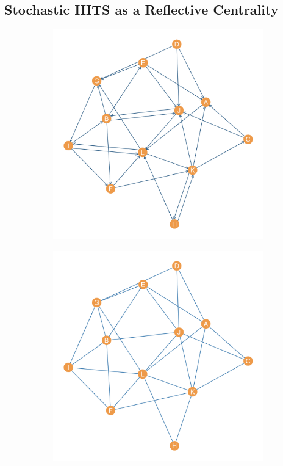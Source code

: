 \documentclass[a4paper,fleqn]{cas-sc}
\begin{document}
\subsection{Stochastic HITS as a Reflective Centrality}

\begin{figure}[t!]
    \captionsetup[subfigure]{font=footnotesize,labelfont=footnotesize}
     \centering
     \begin{subfigure}[b]{0.45\textwidth}
        \includegraphics[width=1.0\textwidth]{Plots/directed.png}
        \caption{}
        \label{fig:directed}
    \end{subfigure} 
     \begin{subfigure}[b]{0.45\textwidth}
        \includegraphics[width=1.0\textwidth]{Plots/undirected.png}

\end{subfigure}
\end{figure}
\end{document}
